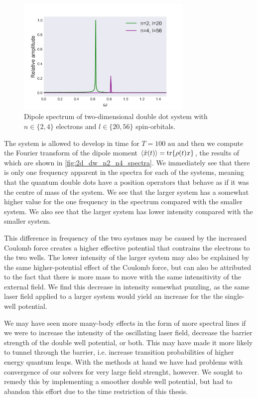 \begin{figure}
    \centering
    \includegraphics[width=0.75\textwidth]{results/figures/DW/dw_n2_n4_spectrum.png} 
    \caption{Dipole spectrum of two-dimensional double dot system with $n\in\{2,4\}$
        electrons and $l\in\{20, 56\}$ spin-orbitals. 
    }
    \label{fig:2d_dw_n2_n4_spectra}
\end{figure}

The system is allowed to develop in time for $T = 100 \text{ au}$ and then we compute the Fourier 
transform of the dipole moment $\ev{\hat{x}(t)} = \tr{\rho(t) x}$, the results of which are shown 
in \autoref{fig:2d_dw_n2_n4_spectra}. We immediately see that there is only one frequency 
apparent in the spectra for each of the systems, meaning that the quantum double dots
have a position operators that behave as if it was the centre of mass of the system. We 
see that the larger system has a somewhat higher value for the one frequency in the spectrum 
compared with the smaller system. We also see that the larger system has lower intensity compared
with the smaller 
system.

This difference in frequency of the two systmes may be caused by the increased Coulomb force
creates a higher effective potential that contrains the electrons to the two wells.
The lower intensity of the larger system may also be explained by the same higher-potential effect 
of the Coulomb force, but can also be attributed to the fact that there is more mass to move with 
the same intensitivity of the external field. We find this decrease in intensity somewhat puzzling,
as the same laser field applied to a larger system would yield an increase for the the single-well 
potential.

We may have seen more many-body effects in the form of more spectral lines if we were to increase 
the intensity of the oscillating laser field, decrease the barrier strength of the double well potential,
or both. This may have made it more likely to tunnel through the barrier, i.e. increase transition 
probabilities of higher energy quantum leaps. With the methods at hand we have had problems with 
convergence of our solvers for very large field strenght, however. We sought to remedy this by 
implementing a smoother double well potential, but had to abandon this effort due to the time 
restriction of this thesis.


